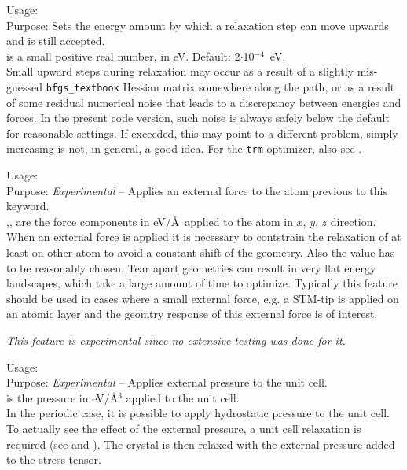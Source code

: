 {
  \noindent
  Usage:   \\[1.0ex]
  Purpose: Sets the energy amount by which a relaxation step can move
    upwards and is still accepted. \\[1.0ex]
   is a small positive real number, in eV. Default:
    2$\cdot$10$^{-4}$~eV. \\
}
Small upward steps during relaxation may occur as a result of a
slightly mis-guessed \texttt{bfgs\_textbook} Hessian matrix somewhere
along the path, or
as a result of some residual numerical noise that leads to a
discrepancy between energies and forces. In the present code version,
such noise is always safely below the default  for
reasonable settings. If exceeded, this may point to a different
problem, simply increasing  is not, in general, a
good idea.  For the \texttt{trm} optimizer, also see
.

{
  \noindent
  Usage:     \\[1.0ex]
  Purpose: \emph{Experimental} -- Applies an external force to the atom previous to this keyword.\\[1.0ex]
  ,, are the force components in eV/\AA\ applied to the atom in $x$, $y$, $z$ direction.\\
}
When an external force is applied it is necessary to contstrain the relaxation of at least on other atom to avoid a constant shift of the geometry. Also the value has to be reasonably chosen. Tear apart geometries can result in very flat energy landscapes, which take a large amount of time to optimize. Typically this feature should be used in cases where a small external force, e.g. a STM-tip is applied on an atomic layer and the geomtry response of this external force is of interest.

\emph{This feature is experimental since no extensive testing was done for it.}


{
  \noindent
  Usage:   \\[1.0ex]
  Purpose: \emph{Experimental} -- Applies external pressure to the unit cell.\\[1.0ex]
   is the pressure in eV/\AA$^3$ applied to the unit cell.\\
}
In the periodic case, it is possible to apply hydrostatic pressure to the unit cell.
To actually see the effect of the external pressure, a unit cell relaxation is required
(see  and ). The crystal is then
relaxed with the external pressure added to the stress tensor.

